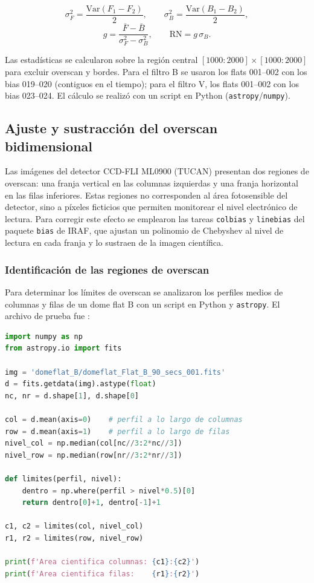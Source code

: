 \documentclass[10pt,a4paper,twocolumn]{article}
\begin{document}
\begin{equation}
\sigma^2_F = \frac{\mathrm{Var}(F_1-F_2)}{2}, \qquad
\sigma^2_B = \frac{\mathrm{Var}(B_1-B_2)}{2},
\end{equation}
\begin{equation}
g = \frac{\bar{F}-\bar{B}}{\sigma^2_F-\sigma^2_B}, \qquad
\mathrm{RN} = g\,\sigma_B .
\end{equation}

\noindent Las estadísticas se calcularon sobre la región central
$[1000:2000]\times[1000:2000]$ para excluir overscan y bordes. Para el filtro B
se usaron los flats 001--002 con los bias 019--020 (contiguos en el tiempo);
para el filtro V, los flats 001--002 con los bias 023--024. El cálculo se
realizó con un script en Python (\texttt{astropy}/\texttt{numpy}).

\subsection{Ajuste y sustracción del overscan bidimensional}
Las imágenes del detector CCD-FLI ML0900 (TUCAN) presentan dos regiones de
overscan: una franja vertical en las columnas izquierdas y una franja
horizontal en las filas inferiores. Estas regiones no corresponden al área
fotosensible del detector, sino a píxeles ficticios que permiten monitorear
el nivel electrónico de lectura. Para corregir este efecto se emplearon las
tareas \texttt{colbias} y \texttt{linebias} del paquete \texttt{bias} de
IRAF, que ajustan un polinomio de Chebyshev al nivel de lectura en cada
franja y lo sustraen de la imagen científica.

\subsubsection{Identificación de las regiones de overscan}

Para determinar los límites de overscan se analizaron los perfiles medios
de columnas y filas de un dome flat B con un script en Python y
\texttt{astropy}. El archivo de prueba fue
:

\begin{lstlisting}[language=Python]
import numpy as np
from astropy.io import fits

img = 'domeflat_B/domeflat_Flat_B_90_secs_001.fits'
d = fits.getdata(img).astype(float)
nc, nr = d.shape[1], d.shape[0]

col = d.mean(axis=0)    # perfil a lo largo de columnas
row = d.mean(axis=1)    # perfil a lo largo de filas
nivel_col = np.median(col[nc//3:2*nc//3])
nivel_row = np.median(row[nr//3:2*nr//3])

def limites(perfil, nivel):
    dentro = np.where(perfil > nivel*0.5)[0]
    return dentro[0]+1, dentro[-1]+1

c1, c2 = limites(col, nivel_col)
r1, r2 = limites(row, nivel_row)

print(f'Area cientifica columnas: {c1}:{c2}')
print(f'Area cientifica filas:    {r1}:{r2}')
\end{lstlisting}
\end{document}
